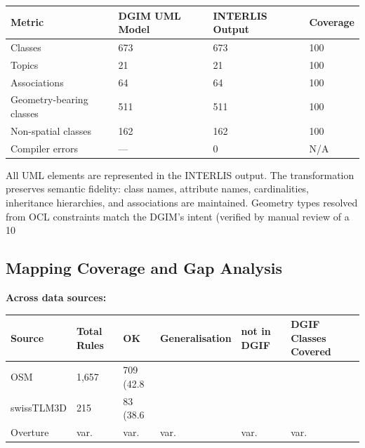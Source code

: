 \documentclass[conference]{IEEEtran}
\begin{document}
\begin{center}
\begin{longtable}{p{}p{}p{}p{}}
Metric & DGIM UML Model & INTERLIS Output & Coverage \\
\midrule
Classes & 673 & 673 & 100\\%
Topics & 21 & 21 & 100\\%
Associations & 64 & 64 & 100\\%
Geometry-bearing classes & 511 & 511 & 100\\%
Non-spatial classes & 162 & 162 & 100\\%
Compiler errors & — & 0 & N/A \\
\end{longtable}
\end{center}


All UML elements are represented in the INTERLIS output. The transformation preserves semantic fidelity: class names, attribute names, cardinalities, inheritance hierarchies, and associations are maintained. Geometry types resolved from OCL constraints match the DGIM's intent (verified by manual review of a 10\\%

\subsection{Mapping Coverage and Gap Analysis}

\textbf{Across data sources:}

\begin{center}
\begin{longtable}{p{}p{}p{}p{}p{}p{}}
Source & Total Rules & OK & Generalisation & not in DGIF & DGIF Classes Covered \\
\midrule
OSM & 1,657 & 709 (42.8\\%
swissTLM3D & 215 & 83 (38.6\\%
Overture & var. & var. & var. & var. & var. \\
\end{longtable}
\end{center}
\end{document}
